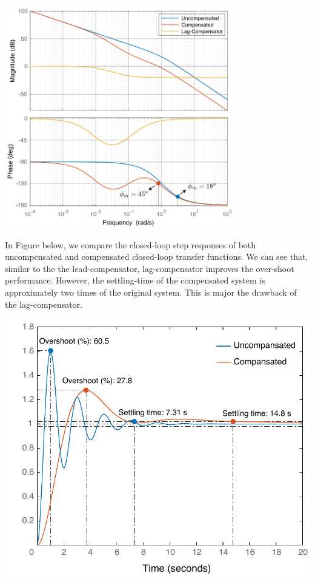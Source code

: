\documentclass[twoside]{article}
\begin{document}
     \begin{center}
 \begin{minipage}[h]{\linewidth}
     \begin{center}
       \includegraphics[width=0.75\textwidth]{complag}
     \end{center}
 \end{minipage}
     \end{center}

In Figure below, we compare the closed-loop step responses
of both uncompensated and compensated closed-loop
transfer functions. We can see that, similar to the the lead-compensator,
lag-compensator improves the over-shoot performance. 
However, the settling-time of the compensated system is approximately
two times of the original system. This is major the drawback of the lag-compensator. 

     \begin{center}
 \begin{minipage}[h]{0.65\linewidth}
     \begin{center}
       \includegraphics[width=\textwidth]{lagstep}
     \end{center}
 \end{minipage}
     \end{center}
\end{document}
